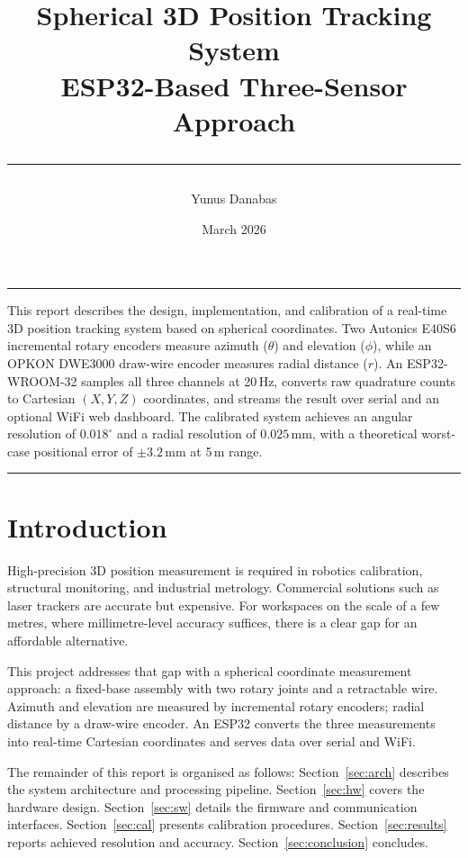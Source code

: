 \documentclass[11pt,a4paper]{article}
\title{%
  \bfseries\LARGE Spherical 3D Position Tracking System\\[8pt]
  \large ESP32-Based Three-Sensor Approach\\[6pt]
  \normalsize\rule{\linewidth}{0.6pt}
}
\author{Yunus Danabas}
\date{March 2026}
\renewenvironment{abstract}
  {\begin{center}\begin{minipage}{0.88\textwidth}
   \rule{\textwidth}{0.4pt}\par\smallskip
   \noindent\textbf{\abstractname}\par\smallskip}
  {\par\rule{\textwidth}{0.4pt}\end{minipage}\end{center}\bigskip}
\begin{document}
\maketitle
\thispagestyle{empty}

\begin{abstract}
This report describes the design, implementation, and calibration of a
real-time 3D position tracking system based on spherical coordinates.
Two Autonics E40S6 incremental rotary encoders measure azimuth
(\(\theta\)) and elevation (\(\phi\)), while an OPKON DWE3000 draw-wire
encoder measures radial distance (\(r\)).  An ESP32-WROOM-32 samples
all three channels at 20\,Hz, converts raw quadrature counts to
Cartesian \((X,Y,Z)\) coordinates, and streams the result over serial
and an optional WiFi web dashboard.  The calibrated system achieves an
angular resolution of \(0.018^\circ\) and a radial resolution of
\(0.025\)\,mm, with a theoretical worst-case positional error of
\(\pm 3.2\)\,mm at 5\,m range.
\end{abstract}

\tableofcontents
\newpage

\section{Introduction}

High-precision 3D position measurement is required in robotics
calibration, structural monitoring, and industrial metrology.
Commercial solutions such as laser trackers are accurate but expensive.
For workspaces on the scale of a few metres, where millimetre-level
accuracy suffices, there is a clear gap for an affordable alternative.

This project addresses that gap with a spherical coordinate measurement
approach: a fixed-base assembly with two rotary joints and a retractable
wire.  Azimuth and elevation are measured by incremental rotary encoders;
radial distance by a draw-wire encoder.  An ESP32 converts the three
measurements into real-time Cartesian coordinates and serves data over
serial and WiFi.

The remainder of this report is organised as follows:
Section~\ref{sec:arch} describes the system architecture and processing
pipeline.  Section~\ref{sec:hw} covers the hardware design.
Section~\ref{sec:sw} details the firmware and communication interfaces.
Section~\ref{sec:cal} presents calibration procedures.
Section~\ref{sec:results} reports achieved resolution and accuracy.
Section~\ref{sec:conclusion} concludes.
\end{document}
